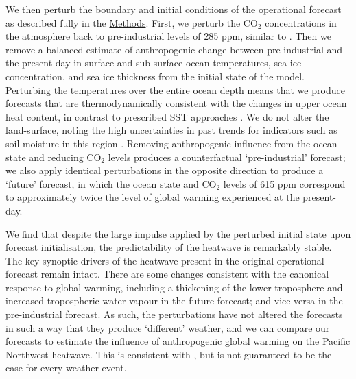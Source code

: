  We then perturb the boundary and initial conditions of the operational forecast as described fully in the \hyperref[ch4:methods]{Methods}. First, we perturb the CO$_2$ concentrations in the atmosphere back to pre-industrial levels of 285 ppm, similar to \citet{leach_forecast-based_2021}. Then we remove a balanced estimate of anthropogenic change between pre-industrial and the present-day in surface and sub-surface ocean temperatures, sea ice concentration, and sea ice thickness \cite{locarnini_world_2019,rayner_global_2003,zuo_ecmwf_2019} from the initial state of the model. Perturbing the temperatures over the entire ocean depth means that we produce forecasts that are thermodynamically consistent with the changes in upper ocean heat content, in contrast to prescribed SST approaches \cite{massey_weatherhome-development_2015,ciavarella_upgrade_2018}. We do not alter the land-surface, noting the high uncertainties in past trends for indicators such as soil moisture in this region \cite{masson-delmotte_water_2021,masson-delmotte_changing_2021,masson-delmotte_atlas_2021}. Removing anthropogenic influence from the ocean state and reducing CO$_2$ levels produces a counterfactual `pre-industrial' forecast; we also apply identical perturbations in the opposite direction to produce a `future' forecast, in which the ocean state and CO$_2$ levels of 615 ppm correspond to approximately twice the level of global warming experienced at the present-day.

  We find that despite the large impulse applied by the perturbed initial state upon forecast initialisation, the predictability of the heatwave is remarkably stable. The key synoptic drivers of the heatwave present in the original operational forecast remain intact. There are some changes consistent with the canonical response to global warming, including a thickening of the lower troposphere \cite{christidis_changes_2015} and increased tropospheric water vapour \cite{allen_constraints_2002} in the future forecast; and vice-versa in the pre-industrial forecast. As such, the perturbations have not altered the forecasts in such a way that they produce `different' weather, and we can compare our forecasts to estimate the influence of anthropogenic global warming on the Pacific Northwest heatwave. This is consistent with \citet{leach_forecast-based_2021}, but is not guaranteed to be the case for every weather event.

